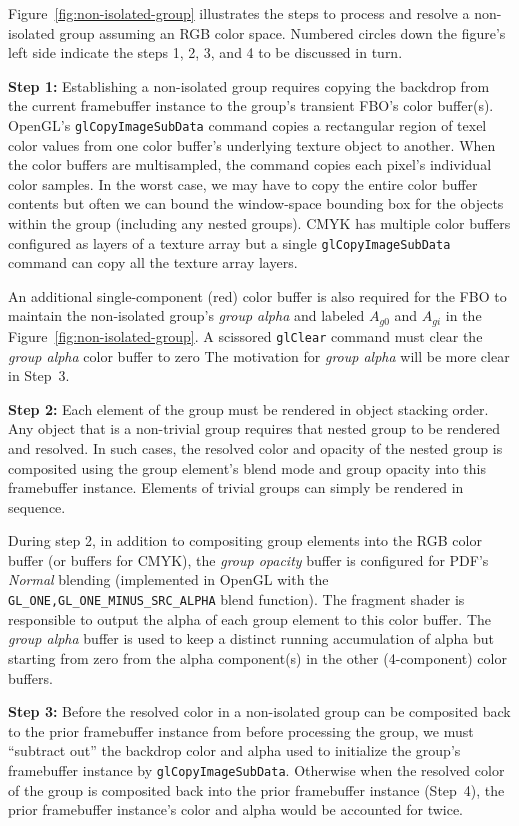 Figure~\ref{fig:non-isolated-group} illustrates the steps to process and resolve a non-isolated group
assuming an RGB color space.
Numbered circles down the figure's left side indicate the steps 1, 2, 3, and 4 to be discussed in turn.

{\bf Step 1:}
Establishing a non-isolated group requires copying the backdrop from the current framebuffer instance
to the group's transient FBO's color buffer(s).  OpenGL's {\tt glCopyImageSubData} command \cite{CopyImageSpec} copies
a rectangular region of texel color values
from one color buffer's underlying texture object to another.  When the color buffers are multisampled, the command
copies each pixel's individual color samples.  In the worst case, we may have to copy the entire
color buffer contents but often we can bound the window-space bounding box for the objects within the
group (including any nested groups).  CMYK has multiple color buffers configured as layers of
a texture array but a single {\tt glCopyImageSubData} command can copy all the texture array layers.

An additional single-component (red) color buffer is also required for the FBO to maintain the non-isolated group's
{\em group alpha} and labeled $A_{g0}$  and $A_{gi}$ in the Figure~\ref{fig:non-isolated-group}.
A scissored {\tt glClear} command must clear the {\em group alpha} color buffer to zero
The motivation for {\em group alpha} will be more clear in Step~3.

{\bf Step 2:}
Each element of the group must be rendered in object stacking order.  Any object that is a non-trivial
group requires that nested group to be rendered and resolved.  In such cases, the resolved color and opacity
of the nested group is composited using the group element's blend mode and group opacity into this
framebuffer instance.  Elements of trivial groups can simply be rendered in sequence.

During step 2, in addition to compositing group elements into the RGB color buffer (or buffers for CMYK),
the {\em group opacity} buffer is configured for PDF's {\em Normal} blending (implemented in OpenGL with
the {\tt GL\_ONE,GL\_ONE\_MINUS\_\-SRC\_ALPHA} blend function).  The fragment shader is responsible to output
the alpha of each group element to this color buffer.  The {\em group alpha} buffer is used to keep
a distinct running accumulation of alpha but starting from zero from the alpha component(s) in the
other (4-component) color buffers.

{\bf Step 3:} 
Before the resolved color in a non-isolated group can be composited back to the prior
framebuffer instance from before processing the group, we must ``subtract out'' the backdrop color and alpha
used to initialize the group's framebuffer instance by {\tt glCopyImageSubData}.  Otherwise when the
resolved color of the group is composited back into the prior framebuffer instance (Step~4), the
prior framebuffer instance's color and alpha would be accounted for twice.

